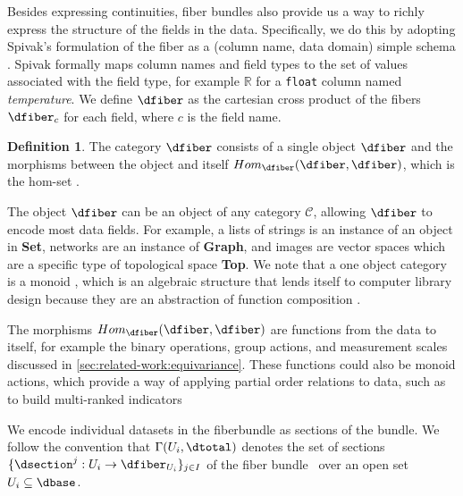 \documentclass[10pt,journal,compsoc]{IEEEtran}
\theoremstyle{definition}
\newtheorem{definition}{Definition}[section]
\theoremstyle{remark}
\begin{document}
Besides expressing continuities, fiber bundles also provide us a way to richly express the structure of the fields in the data. Specifically, we do this by adopting Spivak's formulation of the fiber as a (column name, data domain) simple schema \cite{spivakSIMPLICIALDATABASES,spivakDatabasesAreCategories2010}. Spivak formally maps column names and field types to the set of values associated with the field type, for example $\mathbb{R}$ for a \texttt{float} column named \textit{temperature}. We define $\dfiber$ as  the cartesian cross product of the fibers $\dfiber_c$ for each field, where $c$ is the field name.  

\begin{definition} 
  \label{def:category:F} 
  The category $\mathcal{\dfiber}$ consists of a single object $\dfiber$ and the morphisms between the object and itself $Hom_{\mathcal{\dfiber}}(\dfiber, \dfiber)$, which is the hom-set \cite{maclaneCategoriesWorkingMathematician2013,milewskiCategoryTheoryProgrammers}.
\end{definition}

The object $\texttt{\dfiber}$ can be an object of any category $\mathcal{C}$, allowing $\texttt{\dfiber}$ to encode most data fields. For example, a lists of strings is an instance of an object in \textbf{Set}, networks are an instance of \textbf{Graph}, and images are vector spaces which are a specific type of topological space \textbf{Top}. We note that a one object category is a monoid \cite{nlab:monoid,barrCategoryTheoryComputing}, which is an algebraic structure that lends itself to computer library design because they are an abstraction of function composition \cite{yorgeyMonoidsThemeVariations}. 

The morphisms $Hom_{\mathcal{\dfiber}}(\dfiber, \dfiber)$ are functions from the data to itself, for example the binary operations, group actions, and measurement scales discussed in \autoref{sec:related-work:equivariance}. These functions could also be monoid actions\cite{barrCategoryTheoryComputing}, which provide a way of applying partial order relations to data\cite{fongInvitationAppliedCategory2019}, such as to build multi-ranked indicators\cite{bruggemannRankingPrioritizationMultiindicator2011}

We encode individual datasets in the fiberbundle as sections of the bundle. We follow the convention that $\Gamma(U_i, \dtotal)$ denotes the set of sections $\{\dsection^{j}:U_i \rightarrow \dfiber_{U_{i}}\}_{j\in I}$ of the fiber bundle \dtotal\ over an open set $U_{i}\subseteq \dbase$.  
\end{document}
